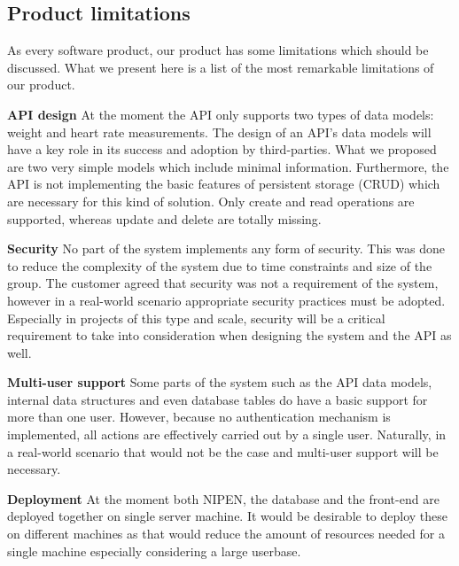 \subsection{Product limitations}
\label{subsec:limitations}

As every software product, our product has some limitations which should be discussed.
What we present here is a list of the most remarkable limitations of our product.

\textbf{API design}\newline
At the moment the API only supports two types of data models: weight and heart rate measurements.
The design of an API's data models will have a key role in its success and adoption by
third-parties. What we proposed are two very simple models which include minimal information.
Furthermore, the API is not implementing the basic features of persistent storage (CRUD)
which are necessary for this kind of solution. Only create and read operations are supported,
whereas update and delete are totally missing.

\textbf{Security}\newline
No part of the system implements any form of security.
This was done to reduce the complexity of the system due to time constraints and size of the group.
The customer agreed that security was not a requirement of the system, however in a real-world scenario
appropriate security practices must be adopted.
Especially in projects of this type and scale, security will be a critical requirement
to take into consideration when designing the system and the API as well.

\textbf{Multi-user support}\newline
Some parts of the system such as the API data models, internal data structures and even
database tables do have a basic support for more than one user. However, because no authentication
mechanism is implemented, all actions are effectively carried out by a single user.
Naturally, in a real-world scenario that would not be the case and multi-user support will
be necessary.

\textbf{Deployment}\newline
At the moment both NIPEN, the database and the front-end are deployed together on single server machine.
It would be desirable to deploy these on different machines as that would reduce
the amount of resources needed for a single machine especially considering a large userbase.



